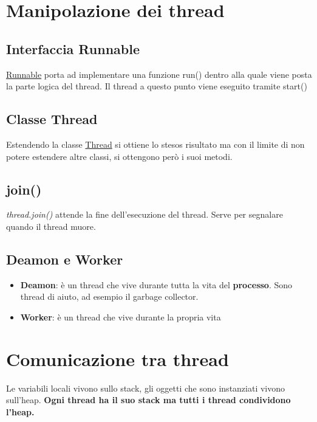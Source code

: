 \documentclass[11pt,a4paper]{book}
\begin{document}
\chapter{Manipolazione dei thread}
\section{Interfaccia Runnable}
\href{https://docs.oracle.com/javase/7/docs/api/java/lang/Runnable.html}{Runnable} porta ad implementare una funzione run() dentro alla quale viene posta la parte logica del thread. Il thread a questo punto viene eseguito tramite start()

\section{Classe Thread}
Estendendo la classe \href{https://docs.oracle.com/javase/7/docs/api/java/lang/Thread.html}{Thread} si ottiene lo stesos risultato ma con il limite di non potere estendere altre classi, si ottengono però i suoi metodi.

\section{join()}
\emph{thread.join()} attende la fine dell'esecuzione del thread. Serve per segnalare quando il thread muore.

\section{Deamon e Worker}
\begin{itemize}
	\item \textbf{Deamon}: è un thread che vive durante tutta la vita del \textbf{processo}. Sono thread di aiuto, ad esempio il garbage collector. 
	\item \textbf{Worker}: è un thread che vive durante la propria vita
\end{itemize}

\chapter{Comunicazione tra thread}
Le variabili locali vivono sullo stack, gli oggetti che sono instanziati vivono sull'heap. \textbf{Ogni thread ha il suo stack ma tutti i thread condividono l'heap.} 
\end{document}
